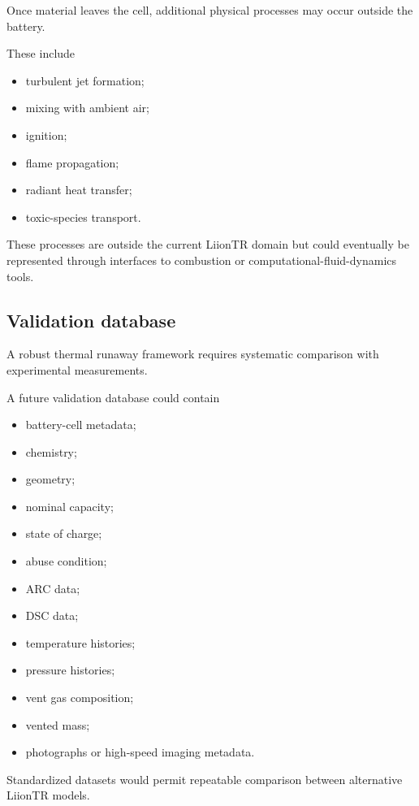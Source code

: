 Once material leaves the cell, additional physical processes may occur
outside the battery.

These include

\begin{itemize}
    \item turbulent jet formation;
    \item mixing with ambient air;
    \item ignition;
    \item flame propagation;
    \item radiant heat transfer;
    \item toxic-species transport.
\end{itemize}

These processes are outside the current LiionTR domain but could
eventually be represented through interfaces to combustion or
computational-fluid-dynamics tools.


\subsection{Validation database}

A robust thermal runaway framework requires systematic comparison with
experimental measurements.

A future validation database could contain

\begin{itemize}
    \item battery-cell metadata;
    \item chemistry;
    \item geometry;
    \item nominal capacity;
    \item state of charge;
    \item abuse condition;
    \item ARC data;
    \item DSC data;
    \item temperature histories;
    \item pressure histories;
    \item vent gas composition;
    \item vented mass;
    \item photographs or high-speed imaging metadata.
\end{itemize}

Standardized datasets would permit repeatable comparison between
alternative LiionTR models.


